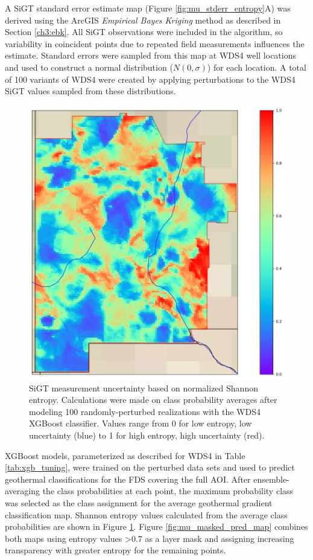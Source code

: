 A SiGT standard error estimate map (Figure \ref{fig:mu_stderr_entropy}A) was derived using the ArcGIS \textit{Empirical Bayes Kriging} method as described in Section \ref{ch3:ebk}. All SiGT observations were included in the algorithm, so variability in coincident points due to repeated field measurements influences the estimate. Standard errors were sampled from this map at WDS4 well locations and used to construct a normal distribution ($N(0,\sigma)$) for each location. A total of 100 variants of WDS4 were created by applying perturbations to the WDS4 SiGT values sampled from these distributions. 

\begin{figure}[!htp]
\centering
\includegraphics[width=.8\textwidth]{templates/images/Figure-MU_Entropy_Map.png}
\caption[SiGT measurement uncertainty map]
{SiGT measurement uncertainty based on normalized Shannon entropy. Calculations were made on class probability averages after modeling 100 randomly-perturbed realizations with the WDS4 XGBoost classifier. Values range from 0 for low entropy, low uncertainty (blue) to 1 for high entropy, high uncertainty (red).}
\label{fig:mu_entropy_map}
\end{figure}

XGBoost models, parameterized as described for WDS4 in Table \ref{tab:xgb_tuning}, were trained on the perturbed data sets and used to predict geothermal classifications for the FDS covering the full AOI. After ensemble-averaging the class probabilities at each point, the maximum probability class was selected as the class assignment for the average geothermal gradient classification map. Shannon entropy values calculated from the average class probabilities are shown in Figure \ref{fig:mu_entropy_map}. Figure \ref{fig:mu_masked_pred_map} combines both maps using entropy values >0.7 as a layer mask and assigning increasing transparency with greater entropy for the remaining points.

